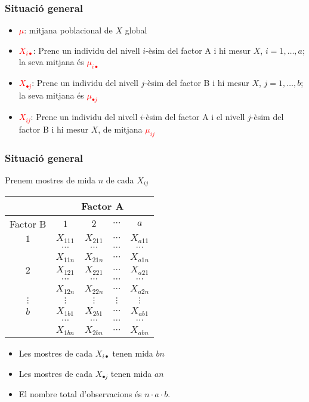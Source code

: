 \documentclass[12pt,t]{beamer}
\newcommand{\red}[1]{\textcolor{red}{#1}}
\theoremstyle{plain}
\theoremstyle{definition}
\begin{document}
\begin{frame}
\frametitle{Situació general} 

\begin{itemize}
\item \red{$\mu$}: mitjana poblacional de $X$ global\medskip

\item \red{$X_{i\bullet}$}: Prenc un individu del  nivell $i$-èsim del factor A i hi mesur $X$,  $i=1,\ldots,a$; la seva mitjana  és \red{$\mu_{i\bullet}$}\medskip

\item \red{$X_{\bullet j}$}: Prenc un individu del  nivell $j$-èsim del factor B i hi mesur $X$, $j=1,\ldots,b$; la seva mitjana  és  \red{$\mu_{\bullet j}$}\medskip

\item  \red{$X_{ij}$}: Prenc un individu del  nivell $i$-èsim del factor A i el  nivell $j$-èsim del factor B i hi mesur $X$, de mitjana  \red{$\mu_{ij}$}
\end{itemize}

\end{frame}


\begin{frame}
\frametitle{Situació general} 


Prenem mostres de mida $n$ de cada $X_{ij}$
\begin{center}
\footnotesize
\begin{tabular}{ccccc}
\hline
&\multicolumn{4}{c}{Factor A}\\\hline
Factor B&$1$&$2$&$\cdots$&$a$\\\hline
$1$&$X_{111}$&$X_{211}$&$\cdots$&$X_{a11}$\\
&$\cdots$&$\cdots$&$\cdots$&$\cdots$\\
&$X_{11n}$&$X_{21n}$&$\cdots$&$X_{a1n}$\\\hline
$2$&$X_{121}$&$X_{221}$&$\cdots$&$X_{a21}$\\
&$\cdots$&$\cdots$&$\cdots$&$\cdots$\\
&$X_{12n}$&$X_{22n}$&$\cdots$&$X_{a2n}$\\\hline
$\vdots$&$\vdots$&$\vdots$&$\vdots$&$\vdots$\\\hline
$b$&$X_{1b1}$&$X_{2b1}$&$\cdots$&$X_{ab1}$\\
&$\cdots$&$\cdots$&$\cdots$&$\cdots$\\
&$X_{1bn}$&$X_{2bn}$&$\cdots$&$X_{abn}$\\\hline
\end{tabular}
\end{center}
\begin{itemize}
\item Les mostres de cada $X_{i\bullet}$ tenen mida $bn$
\item Les mostres de cada $X_{\bullet j}$ tenen mida $an$
\item  El nombre total d'observacions és $n\cdot a\cdot b$.
\end{itemize}

\end{frame}
\end{document}
